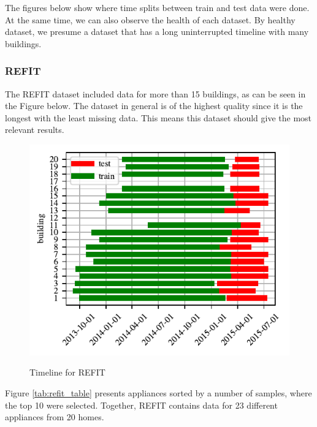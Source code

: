 The figures below show where time splits between train and test data were done.
At the same time, we can also observe the health of each dataset.
By healthy dataset, we presume a dataset that has a long uninterrupted timeline with many buildings.


\subsubsection{REFIT}
The REFIT \cite{REFIT} dataset included data for more than 15 buildings, as can be seen in the Figure below.
The dataset in general is of the highest quality since it is the longest with the least missing data.
This means this dataset should give the most relevant results.
\begin{figure}[H]
	\centering
	\caption{Timeline for REFIT}
	\includegraphics[]{Figures/EC/refit_timeline.pdf}
	\label{fig:refit_timeline}
\end{figure}

Figure \ref{tab:refit_table} presents appliances sorted by a number of samples, where the top 10 were selected.
Together, REFIT contains data for 23 different appliances from 20 homes.

